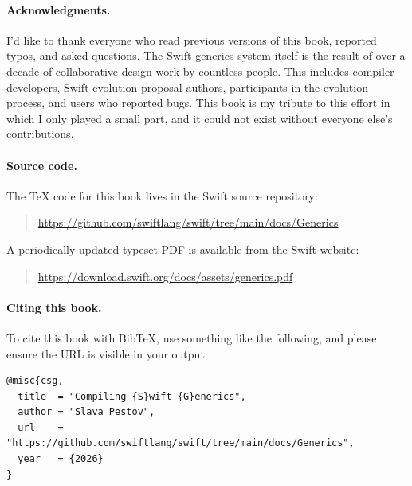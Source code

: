 \documentclass[../generics]{subfiles}
\begin{document}
\paragraph{Acknowledgments.}
I'd like to thank everyone who read previous versions of this book, reported typos, and asked questions. The Swift generics system itself is the result of over a decade of collaborative design work by countless people. This includes compiler developers, Swift evolution proposal authors, participants in the evolution process, and users who reported bugs. This book is my tribute to this effort in which I only played a small part, and it could not exist without everyone else's contributions.

\paragraph{Source code.}
The \TeX{} code for this book lives in the Swift source repository:
\begin{quote}
\url{https://github.com/swiftlang/swift/tree/main/docs/Generics}
\end{quote}
A periodically-updated typeset PDF is available from the Swift website:
\begin{quote}
\url{https://download.swift.org/docs/assets/generics.pdf}
\end{quote}


\paragraph{Citing this book.} To cite this book with BibTeX, use something like the following, and please ensure the URL is visible in your output:
\begin{Verbatim}
@misc{csg,
  title  = "Compiling {S}wift {G}enerics",
  author = "Slava Pestov",
  url    = "https://github.com/swiftlang/swift/tree/main/docs/Generics",
  year   = {2026}
}
\end{Verbatim}
\end{document}
